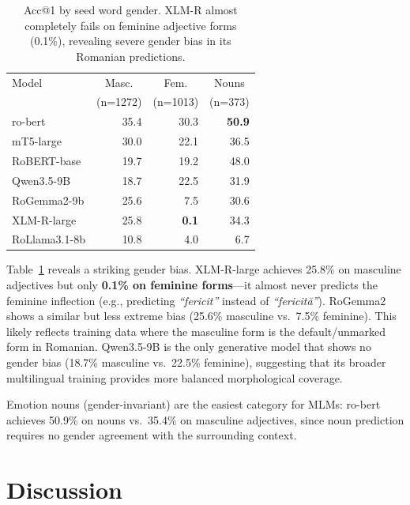 \documentclass[11pt]{article}
\begin{document}
\begin{table}[t]
    \centering
    \small
    \begin{tabular}{lrrr}
        \toprule
        Model & \multicolumn{1}{c}{Masc.} & \multicolumn{1}{c}{Fem.} & \multicolumn{1}{c}{Nouns} \\
        & \multicolumn{1}{c}{(n=1272)} & \multicolumn{1}{c}{(n=1013)} & \multicolumn{1}{c}{(n=373)} \\
        \midrule
        ro-bert & 35.4 & 30.3 & \textbf{50.9} \\
        mT5-large & 30.0 & 22.1 & 36.5 \\
        RoBERT-base & 19.7 & 19.2 & 48.0 \\
        Qwen3.5-9B & 18.7 & 22.5 & 31.9 \\
        RoGemma2-9b & 25.6 & 7.5 & 30.6 \\
        XLM-R-large & 25.8 & \textbf{0.1} & 34.3 \\
        RoLlama3.1-8b & 10.8 & 4.0 & 6.7 \\
        \bottomrule
    \end{tabular}
    \caption{Acc@1 by seed word gender. XLM-R almost completely fails on feminine adjective forms (0.1\%), revealing severe gender bias in its Romanian predictions.}
    \label{tab:by-gender}
\end{table}

Table~\ref{tab:by-gender} reveals a striking gender bias. XLM-R-large achieves 25.8\% on masculine adjectives but only \textbf{0.1\% on feminine forms}---it almost never predicts the feminine inflection (e.g., predicting \textit{``fericit''} instead of \textit{``fericit\u{a}''}). RoGemma2 shows a similar but less extreme bias (25.6\% masculine vs.\ 7.5\% feminine). This likely reflects training data where the masculine form is the default/unmarked form in Romanian. Qwen3.5-9B is the only generative model that shows no gender bias (18.7\% masculine vs.\ 22.5\% feminine), suggesting that its broader multilingual training provides more balanced morphological coverage.

Emotion nouns (gender-invariant) are the easiest category for MLMs: ro-bert achieves 50.9\% on nouns vs.\ 35.4\% on masculine adjectives, since noun prediction requires no gender agreement with the surrounding context.


\section{Discussion}
\end{document}
